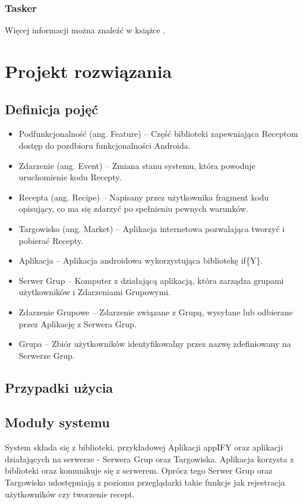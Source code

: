 \documentclass[11pt,a4paper,polish,thesis]{dcsbook}
\begin{document}
\subsection{Tasker}
Więcej informacji można znaleźć w książce \cite{sop}.
\chapter{Projekt rozwiązania}
\section{Definicja pojęć}
\begin{itemize}
\item Podfunkcjonalność (ang. Feature) -- Część biblioteki zapewniająca Receptom dostęp do pozdbioru funkcjonalności Androida.
\item Zdarzenie (ang. Event) -- Zmiana stanu systemu, która powoduje uruchomienie kodu Recepty.
\item Recepta (ang. Recipe) -- Napisany przez użytkownika fragment kodu opisujący, co ma się zdarzyć po spełnieniu pewnych warunków.
\item Targowisko (ang. Market) -- Aplikacja internetowa pozwalająca tworzyć i pobierać Recepty.
\item Aplikacja -- Aplikacja androidowa wykorzystująca bibliotekę if\{Y\}. 
\item Serwer Grup -- Komputer z działającą aplikacją, która zarządza grupami użytkowników i Zdarzeniami Grupowymi.
\item Zdarzenie Grupowe -- Zdarzenie związane z Grupą, wysyłane lub odbierane przez Aplikację z Serwera Grup.
\item Grupa -- Zbiór użytkowników identyfikowalny przez nazwę zdefiniowany na Serwerze Grup.
\end{itemize}

\section{Przypadki użycia}
\section{Moduły systemu}
System składa się z biblioteki, przykładowej Aplikacji appIFY oraz aplikacji działających na serwerze - Serwera Grup oraz Targowiska.
Aplikacja korzysta z biblioteki oraz komunikuje się z serwerem. Oprócz tego Serwer Grup oraz Targowisko udostępniają z poziomu przeglądarki takie funkcje jak rejestracja użytkowników czy tworzenie recept.
\end{document}
